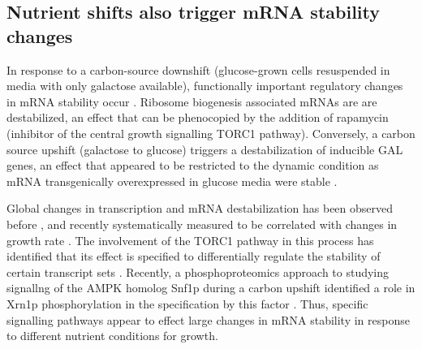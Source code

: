 \subsection{Nutrient shifts also trigger mRNA stability changes }

In response to a carbon-source downshift
(glucose-grown cells resuspended in media with only galactose
available), functionally important regulatory changes in mRNA
stability occur 
\parencite{munchel2011dynamic}. Ribosome biogenesis associated
mRNAs are are destabilized, an effect that can be phenocopied by the
addition of rapamycin (inhibitor of the central growth signalling
TORC1 pathway). Conversely, a carbon source
upshift (galactose to glucose) triggers a destabilization of inducible
GAL genes, an effect that appeared to be restricted to the dynamic
condition as mRNA transgenically overexpressed in glucose media were
stable \parencite{munchel2011dynamic}.

Global changes in transcription and
mRNA destabilization has been observed before 
\parencite{jona2000glucose}, and
recently systematically measured to be correlated with changes in
growth rate 
\parencite{garcia2016growth}. The involvement of the
TORC1 pathway in this process has identified that its effect is
specified to differentially regulate the stability of certain
transcript sets 
\parencite{albig2001target,talarek2010initiation}.
Recently, a phosphoproteomics approach to studying signallng of the
AMPK homolog Snf1p during a carbon upshift identified a role in Xrn1p
phosphorylation in the specification by this factor 
\parencite{braun2014phosphoproteomic}. 
Thus, specific signalling pathways appear to effect large
changes in mRNA stability in response to different nutrient conditions
for growth. 

